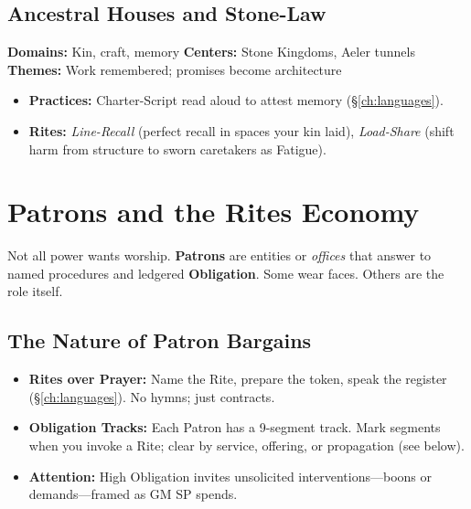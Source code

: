 \begin{multicols}{2}
\subsection*{Ancestral Houses and Stone-Law}
\textbf{Domains:} Kin, craft, memory \quad
\textbf{Centers:} Stone Kingdoms, Aeler tunnels \\
\textbf{Themes:} Work remembered; promises become architecture
\begin{itemize}
  \item \textbf{Practices:} Charter-Script read aloud to attest memory (\S\ref{ch:languages}). 
  \item \textbf{Rites:} \emph{Line-Recall} (perfect recall in spaces your kin laid), \emph{Load-Share} (shift harm from structure to sworn caretakers as Fatigue).
\end{itemize}

\section{Patrons and the Rites Economy}
Not all power wants worship. \textbf{Patrons} are entities or \emph{offices} that answer to named procedures and ledgered \textbf{Obligation}. Some wear faces. Others are the role itself.

\subsection*{The Nature of Patron Bargains}
\begin{itemize}
  \item \textbf{Rites over Prayer:} Name the Rite, prepare the token, speak the register (\S\ref{ch:languages}). No hymns; just contracts. 
  \item \textbf{Obligation Tracks:} Each Patron has a 9-segment track. Mark segments when you invoke a Rite; clear by service, offering, or propagation (see below).
  \item \textbf{Attention:} High Obligation invites unsolicited interventions—boons or demands—framed as GM SP spends.
\end{itemize}


\end{multicols}
